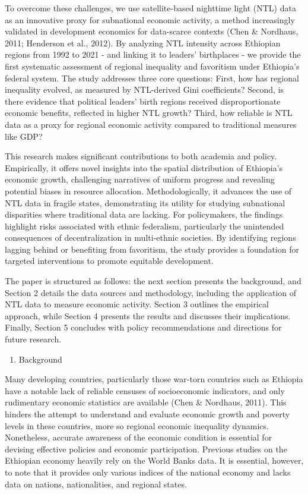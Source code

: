 To overcome these challenges, we use satellite-based nighttime light
(NTL) data as an innovative proxy for subnational economic activity, a
method increasingly validated in development economics for data-scarce
contexts (Chen \& Nordhaus, 2011; Henderson et al., 2012). By analyzing
NTL intensity across Ethiopian regions from 1992 to 2021 - and linking
it to leaders' birthplaces - we provide the first systematic assessment
of regional inequality and favoritism under Ethiopia's federal system.
The study addresses three core questions: First, how has regional
inequality evolved, as measured by NTL-derived Gini coefficients?
Second, is there evidence that political leaders' birth regions received
disproportionate economic benefits, reflected in higher NTL growth?
Third, how reliable is NTL data as a proxy for regional economic
activity compared to traditional measures like GDP?

This research makes significant contributions to both academia and
policy. Empirically, it offers novel insights into the spatial
distribution of Ethiopia's economic growth, challenging narratives of
uniform progress and revealing potential biases in resource allocation.
Methodologically, it advances the use of NTL data in fragile states,
demonstrating its utility for studying subnational disparities where
traditional data are lacking. For policymakers, the findings highlight
risks associated with ethnic federalism, particularly the unintended
consequences of decentralization in multi-ethnic societies. By
identifying regions lagging behind or benefiting from favoritism, the
study provides a foundation for targeted interventions to promote
equitable development.

The paper is structured as follows: the next section presents the
background, and Section 2 details the data sources and methodology,
including the application of NTL data to measure economic activity.
Section 3 outlines the empirical approach, while Section 4 presents the
results and discusses their implications. Finally, Section 5 concludes
with policy recommendations and directions for future research.

\begin{enumerate}
\def\labelenumi{\arabic{enumi}.}
\item
  Background
\end{enumerate}

Many developing countries, particularly those war-torn countries such as
Ethiopia have a notable lack of reliable censuses of socioeconomic
indicators, and only rudimentary economic statistics are available (Chen
\& Nordhaus, 2011). This hinders the attempt to understand and evaluate
economic growth and poverty levels in these countries, more so regional
economic inequality dynamics. Nonetheless, accurate awareness of the
economic condition is essential for devising effective policies and
economic participation. Previous studies on the Ethiopian economy
heavily rely on the World Bank\textquotesingle s data. It is essential,
however, to note that it provides only various indices of the national
economy and lacks data on nations, nationalities, and regional states.

